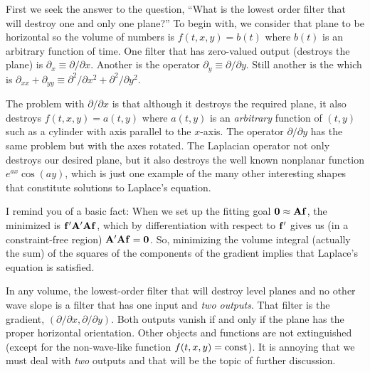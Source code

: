 \par\noindent
{}

\par
First we seek the answer to the question,
``What is the lowest order filter that will destroy
one and only one plane?''
To begin with, we consider that plane to be horizontal
so the volume of numbers is
$f(t,x,y) = b(t)$
where $b(t)$ is an arbitrary function of time.
One filter that has zero-valued output (destroys the plane)
is 
$\partial_x \equiv \partial / \partial x$.
Another is the operator
$\partial_y \equiv \partial / \partial y$.
Still another is the  which is
$\partial_{xx}+\partial_{yy}\equiv\partial^2/\partial x^2+\partial^2/\partial y^2$.

\par
The problem with $\partial / \partial x$ is that
although it destroys the required plane,
it also destroys
$f(t,x,y) = a(t,y)$ where $a(t,y)$ is an {\it arbitrary} function of $(t,y)$
such as a cylinder with axis parallel to the $x$-axis.
The operator $\partial / \partial y$ has the same problem
but with the axes rotated.
The Laplacian operator not only destroys our desired plane,
but it also destroys the well known nonplanar function
$e^{ax}\cos(ay)$,
which is just one example of the many other interesting shapes
that constitute solutions to Laplace's equation.
\par
I remind you of a basic fact:
When we set up the fitting goal $\bold 0\approx \bold A \bold f$,
the  minimized is $\bold f'\bold A' \bold A \bold f$,
which by differentiation with respect to $\bold f'$
gives us (in a constraint-free region) $\bold A'\bold A\bold f = \bold 0$.
So, minimizing the volume integral (actually the sum)
of the squares of the components of the gradient
implies that Laplace's equation is satisfied.

\par
In any volume,
the lowest-order filter
that will destroy level planes and no other wave slope
is a filter that has one input and {\it two outputs}.
That filter is the gradient,
$(\partial / \partial x, \partial / \partial y)$.
Both outputs vanish if and only if
the plane has the proper horizontal orientation.
Other objects and functions are not extinguished
(except for the non-wave-like function $f(t,x,y)= {\rm const}$).
It is annoying that we must deal with {\it two} outputs
and that will be the topic of further discussion.

